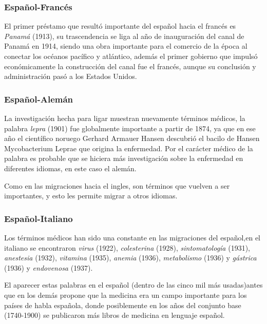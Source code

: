 \subsubsection*{Español-Francés}%

El primer préstamo que resultó importante del español hacia el francés es \textit{Panamá} (1913), su trascendencia se liga al año de inauguración del canal de Panamá en 1914, siendo una obra importante para el comercio de la época al conectar los océanos pacífico y atlántico, además el primer gobierno que impulsó económicamente la construcción del canal fue el francés,  aunque su conclusión y administración pasó a los Estados Unidos.  




\subsubsection*{Español-Alemán}%


La investigación hecha para ligar muestran nuevamente términos médicos, la palabra \textit{lepra} (1901) fue globalmente importante a partir de 1874,  ya que en ese año el científico noruego Gerhard Armauer Hansen descubrió el bacilo de Hansen Mycobacterium Leprae \cite{lepra} que origina la enfermedad. Por el carácter médico de la palabra es probable que se hiciera más investigación sobre la enfermedad en diferentes idiomas, en este caso el alemán.

Como en las migraciones hacia el ingles, son términos que vuelven a ser importantes,  y esto les permite migrar a otros idiomas. 


\subsubsection*{Español-Italiano}%

Los términos médicos han sido una constante en las migraciones del español,en el italiano se encontraron \textit{virus} (1922), \textit{colesterina} (1928),  \textit{sintomatología} (1931), \textit{anestesia} (1932), \textit{vitamina} (1935), \textit{anemia} (1936), \textit{metabolismo} (1936) y \textit{gástrica} (1936)  y \textit{endovenosa} (1937).  

El aparecer estas palabras en el español (dentro de las cinco mil más usadas)antes que en los demás propone que la medicina era un campo importante para los países de habla española, donde posiblemente en los años del conjunto base (1740-1900) se publicaron más libros de medicina en lenguaje español. 






